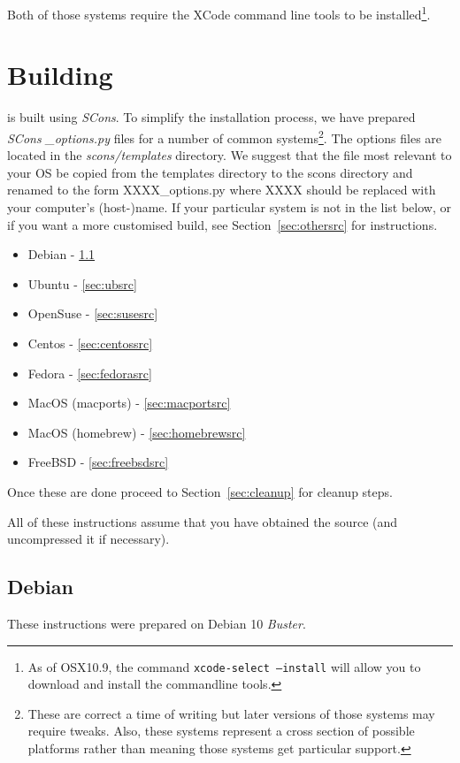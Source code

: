 \noindent Both of those systems require the XCode command line tools to be installed\footnote{As of OSX10.9, the
command \texttt{xcode-select --install} will allow you to download and install the commandline tools.}.

\section{Building}\label{sec:build}

\esfinley is built using \textit{SCons}. To simplify the installation process, we have prepared \textit{SCons} \textit{_options.py} files for a number of common systems\footnote{These are correct a time of writing but later versions of those systems may require tweaks.
Also, these systems represent a cross section of possible platforms rather than meaning those systems get particular support.}.
The options files are located in the \textit{scons/templates} directory. We suggest that the file most relevant to your OS
be copied from the templates directory to the scons directory and renamed to the form XXXX_options.py where XXXX
should be replaced with your computer's (host-)name.
If your particular system is not in the list below, or if you want a more customised
build,
see Section~\ref{sec:othersrc} for instructions.
\begin{itemize}
 \item Debian - \ref{sec:debsrc}
 \item Ubuntu - \ref{sec:ubsrc}
 \item OpenSuse - \ref{sec:susesrc}
 \item Centos - \ref{sec:centossrc}
 \item Fedora - \ref{sec:fedorasrc}
 \item MacOS (macports) - \ref{sec:macportsrc}
 \item MacOS (homebrew) - \ref{sec:homebrewsrc}
 \item FreeBSD - \ref{sec:freebsdsrc}
\end{itemize}

Once these are done proceed to Section~\ref{sec:cleanup} for cleanup steps.

\noindent All of these instructions assume that you have obtained the \escript source (and uncompressed it if necessary).
\subsection{Debian}\label{sec:debsrc}
\noindent These instructions were prepared on Debian 10 \textit{Buster}.

